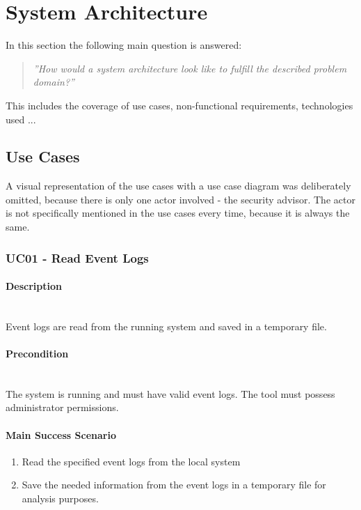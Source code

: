 \section{System Architecture}
In this section the following main question is answered: 
\begin{quotation}
    \textit{''How would a system architecture look like to fulfill the described problem domain?''}
\end{quotation}
This includes the coverage of use cases, non-functional requirements, technologies used ...

\subsection{Use Cases}
A visual representation of the use cases with a use case diagram was deliberately omitted, because there is only one actor involved - the security advisor. The actor is not specifically mentioned in the use cases every time, because it is always the same.

\subsubsection{UC01 - Read Event Logs}
\begin{tcolorbox}
    \paragraph{Description} \ \\
    Event logs are read from the running system and saved in a temporary file.
    \ \\
    \paragraph{Precondition} \ \\
    The system is running and must have valid event logs. The tool must possess administrator permissions.
    \ \\
    \paragraph{Main Success Scenario} 
    \begin{enumerate}
        \item Read the specified event logs from the local system
        \item Save the needed information from the event logs in a temporary file for analysis purposes.
    \end{enumerate}
\end{tcolorbox}


